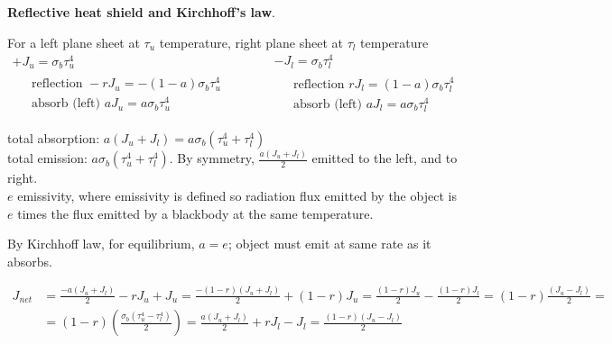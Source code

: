  \textbf{Reflective heat shield and Kirchhoff's law}.  

For a left plane sheet at $\tau_u$ temperature, right plane sheet at $\tau_l$ temperature
\[
\begin{gathered}
  +J_u = \sigma_b \tau_u^4 \\
  \begin{aligned}
    & \text{ reflection }  -r J_u = - (1-a) \sigma_b \tau_u^4 \\ 
    & \text{ absorb (left) } aJ_u = a \sigma_b \tau_u^4 
\end{aligned}
\end{gathered}
 \quad \quad \quad \begin{gathered}
   -J_l = \sigma_b \tau_l^4  \\ 
  \begin{aligned}
    & \text{ reflection } r J_l = (1- a) \sigma_b \tau_l^4 \\ 
    & \text{ absorb (left) } aJ_l = a \sigma_b \tau_l^4 
\end{aligned}
\end{gathered}
\]

total absorption: $a(J_u + J_l) = a\sigma_b(\tau_u^4 + \tau_l^4 ) $ \\
total emission: $a\sigma_b (\tau_u^4 + \tau_l^4 )$.  By symmetry, $\frac{a(J_u + J_l ) }{2}$ emitted to the left, and to right.\\
$e$ emissivity, where emissivity is defined so radiation flux emitted by the object is $e$ times the flux emitted by a blackbody at the same temperature.  

By Kirchhoff law, for equilibrium, $a=e$; object must emit at same rate as it absorbs.  

\[
\begin{aligned}
  J_{net} & = \frac{-a(J_u + J_l )}{2} - r J_u + J_u = \frac{ - (1-r)(J_u  + J_l ) }{2} + (1-r) J_u = \frac{(1-r) J_u }{2} - \frac{(1-r) J_l }{2} = (1-r) \frac{(J_u - J_l)}{2} = \\
  & = (1-r) \left( \frac{ \sigma_b (\tau_u^4 - \tau_l^4  )}{2} \right)  = \frac{a(J_u + J_l )}{2} + r J_l - J_l    = \boxed{ \frac{(1-r) (J_u - J_l) }{2}  }
\end{aligned} 
\]







